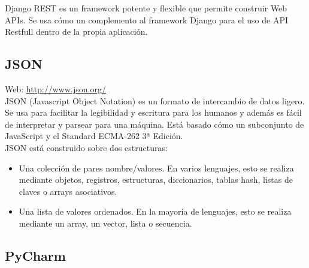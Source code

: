 Django REST es un framework potente y flexible que permite construir Web APIs. Se usa cómo un complemento al framework Django para el uso de API Restfull dentro de la propia aplicación.

\subsection{JSON}

Web: \url{http://www.json.org/}\\

JSON (Javascript Object Notation) es un formato de intercambio de datos ligero. Se usa para facilitar la legibilidad y escritura para los humanos y además es fácil de interpretar y parsear para una máquina. Está basado cómo un subconjunto de JavaScript y el Standard ECMA-262 3ª Edición. \\

JSON está construido sobre dos estructuras:

\begin{itemize}
\item Una colección de pares nombre/valores. En varios lenguajes, esto se realiza mediante objetos, registros, estructuras, diccionarios, tablas hash, listas de claves o arrays asociativos.
\item Una lista de valores ordenados. En la mayoría de lenguajes, esto se realiza mediante un array, un vector, lista o secuencia.
\end{itemize}

\subsection{PyCharm}


